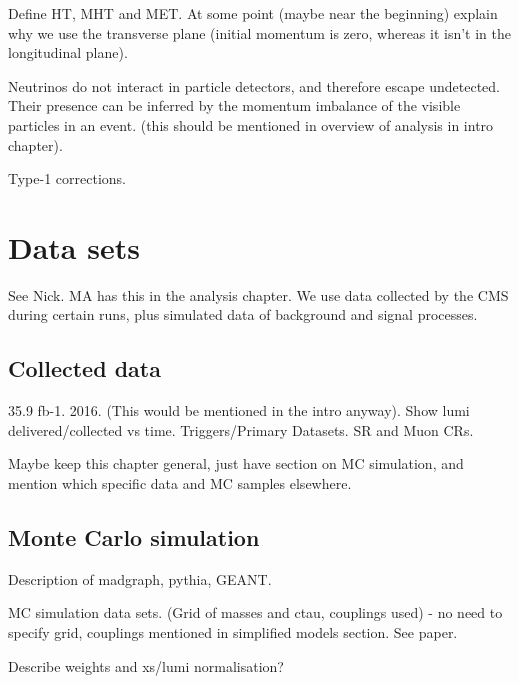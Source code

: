 Define HT, MHT and MET. At some point (maybe near the beginning) explain why we 
use  the transverse plane (initial momentum is zero, whereas it isn't in the 
longitudinal plane).

Neutrinos do not interact in particle detectors, and therefore escape 
undetected. Their presence can be inferred by the momentum imbalance of the 
visible particles in an event. (this should be mentioned in overview of 
analysis in intro chapter).

Type-1 corrections.

\section{Data sets}

See Nick. MA has this in the analysis chapter.
We use data collected by the CMS during certain runs, plus simulated data of 
background and signal processes.

\subsection{Collected data}

35.9 fb-1. 2016. (This would be mentioned in the intro anyway).
Show lumi delivered/collected vs time.
Triggers/Primary Datasets.
SR and Muon CRs.

Maybe keep this chapter general, just have section on MC simulation, and 
mention which specific data and MC samples elsewhere.

\subsection{Monte Carlo simulation}

Description of madgraph, pythia, GEANT.

MC simulation data sets.
(Grid of masses and ctau, couplings used) - no need to specify grid, couplings 
mentioned in simplified models section.
See paper.

Describe weights and xs/lumi normalisation?